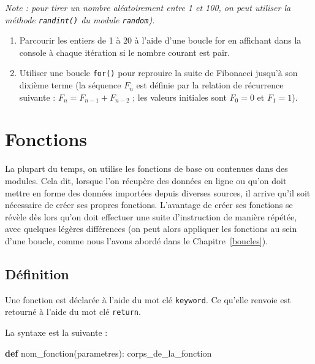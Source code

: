 \documentclass[12pt,]{book}
\newenvironment{Shaded}{\begin{snugshade}}{\end{snugshade}}
\newcommand{\KeywordTok}[1]{\textcolor[rgb]{0.13,0.29,0.53}{\textbf{#1}}}
\newcommand{\NormalTok}[1]{#1}
\providecommand{\tightlist}{%
  \setlength{\itemsep}{0pt}\setlength{\parskip}{0pt}}
\numberwithin{equation}{section}
\numberwithin{countremarque}{section}
\begin{document}
\emph{Note : pour tirer un nombre aléatoirement entre 1 et 100, on peut
utiliser la méthode \texttt{randint()} du module \texttt{random}).}

\begin{enumerate}
\def\labelenumi{\arabic{enumi}.}
\setcounter{enumi}{2}
\tightlist
\item
  Parcourir les entiers de 1 à 20 à l'aide d'une boucle for en affichant
  dans la console à chaque itération si le nombre courant est pair.
\item
  Utiliser une boucle \texttt{for()} pour reprouire la suite de
  Fibonacci jusqu'à son dixième terme (la séquence \(F_n\) est définie
  par la relation de récurrence suivante : \(F_n = F_{n-1} + F_{n-2}\) ;
  les valeurs initiales sont \(F_0 = 0\) et \(F_1 = 1\)).
\end{enumerate}

\chapter{Fonctions}\label{fonctions}

La plupart du temps, on utilise les fonctions de base ou contenues dans
des modules. Cela dit, lorsque l'on récupère des données en ligne ou
qu'on doit mettre en forme des données importées depuis diverses
sources, il arrive qu'il soit nécessaire de créer ses propres fonctions.
L'avantage de créer ses fonctions se révèle dès lors qu'on doit
effectuer une suite d'instruction de manière répétée, avec quelques
légères différences (on peut alors appliquer les fonctions au sein d'une
boucle, comme nous l'avons abordé dans le Chapitre~\ref{boucles}).

\section{Définition}\label{definition}

Une fonction est déclarée à l'aide du mot clé \texttt{keyword}. Ce
qu'elle renvoie est retourné à l'aide du mot clé \texttt{return}.

La syntaxe est la suivante :

\begin{Shaded}
\begin{Highlighting}[]
\KeywordTok{def}\NormalTok{ nom_fonction(parametres):}
\NormalTok{  corps_de_la_fonction}
\end{Highlighting}
\end{Shaded}
\end{document}
